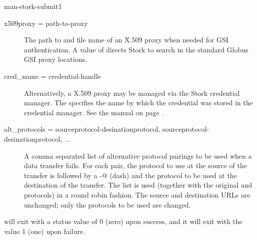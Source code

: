 \begin{ManPage}{}{man-stork-submit}{1}
\begin{description}


\item[x509proxy = \lt{}path-to-proxy\gt{}]
The path to and file name of an X.509 proxy when needed
for GSI authentication.  A value of  directs Stork to
search in the standard Globus GSI proxy locations.

\item[cred\_name = \lt{}credential-handle\gt{}]
Alternatively, a X.509 proxy may be managed via the Stork credential manager.
The  specifies the name by which the credential was
stored in the credential manager.  See the 
 manual on page \pageref{man-stork-store-cred}.

\item[alt\_protocols = \lt{}sourceprotocol-desinationprotocol, sourceprotocol-desinationprotocol, ...\gt{}]
A comma separated list of alternative protocol pairings to be used
when a data transfer fails.
For each pair, the protocol to use at the source of the transfer
is followed by a \verb@-@ (dash) and the protocol to be used
at the destination of the transfer.
The list is used
(together with the original 
and  protocols)
in a round robin fashion.
The source and destination URLs are unchanged;
only the protocols to be used are changed.


\end{description}


\begin{Options}
  \ToolArgsBaseDesc
  \StorknameDesc
\end{Options}

\ExitStatus

 will exit with a status value of 0 (zero) upon success,
and it will exit with the value 1 (one) upon failure.

\end{ManPage}
